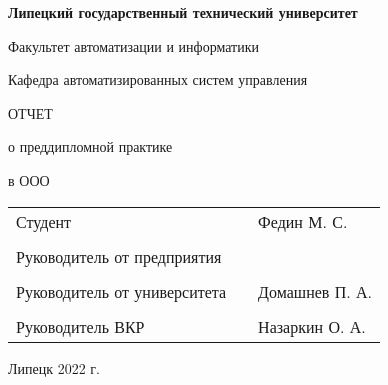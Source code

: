 \begin{center}
    \textbf{Липецкий государственный технический университет}

    Факультет автоматизации и информатики

    Кафедра автоматизированных систем управления
\end{center}

\vfill

\begin{center}
    ОТЧЕТ

    о преддипломной практике

    в ООО 
\end{center}
\vfill

\noindent\begin{tabularx}{\textwidth}{lCl}
    Студент & & Федин М. С. \\
     \\
    Руководитель от предприятия & & \\
     \\
    Руководитель от университета & & Домашнев П. А. \\
     \\
    Руководитель ВКР & & Назаркин О. А. \\
\end{tabularx}

\vfill

\begin{center}
    Липецк 2022 г.
\end{center}
\thispagestyle{empty}
\clearpage
